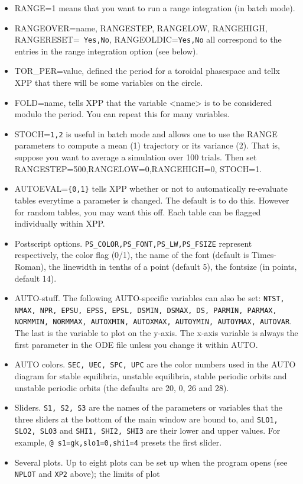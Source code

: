 \documentclass{article}
\begin{document}
\begin{itemize}
reached.
\item RANGE=1 means that you want to run a range integration (in batch
mode). 
\item RANGEOVER=name, RANGESTEP, RANGELOW, RANGEHIGH, RANGERESET={\tt
Yes,No}, RANGEOLDIC={\tt Yes,No} all correspond to the entries in the
range integration option (see below).
\item TOR\_PER=value, defined the period for a toroidal phasespace and
tellx XPP that there will be some variables on the circle.
\item FOLD=name, tells XPP that the variable <name> is to be
considered modulo the period.  You can repeat this for many variables.
\item STOCH={\tt 1,2} is useful in batch mode and allows one to use
the RANGE parameters to compute a mean (1) trajectory or its variance
(2).  That is, suppose you want to average a simulation over 100
trials.  Then set RANGESTEP=500,RANGELOW=0,RANGEHIGH=0, STOCH=1. 
\item AUTOEVAL={\tt \{0,1\}} tells XPP whether or not to automatically
re-evaluate tables everytime a parameter is changed. The default is 
to do this. However for random tables, you may want this off. Each
table can be flagged individually within XPP.
\item Postscript options. {\tt PS\_COLOR,PS\_FONT,PS\_LW,PS\_FSIZE}
represent respectively, the color flag (0/1), the name of the font
(default is Times-Roman), the linewidth in tenths of a point (default
5), the fontsize (in points, default 14). 
\item AUTO-stuff. The following AUTO-specific variables can also be
set: {\tt NTST, NMAX, NPR, EPSU, EPSS, EPSL, DSMIN, DSMAX, DS, PARMIN, PARMAX, NORMMIN,
NORMMAX, AUTOXMIN, AUTOXMAX, AUTOYMIN, AUTOYMAX, AUTOVAR}.  The last
is the variable to plot on the y-axis. The x-axis variable is always
the first parameter in the ODE file unless you change it within AUTO. 
\item AUTO colors. {\tt SEC, UEC, SPC, UPC} are the color numbers used in the AUTO diagram for stable equilibria,
unstable equilibria, stable periodic orbits and unstable periodic orbits (the defaults are 20, 0, 26 and 28).
\item Sliders. {\tt S1, S2, S3} are the names of the parameters or variables that the three sliders at the bottom of the main window are bound
to, and {\tt SLO1, SLO2, SLO3} and {\tt SHI1, SHI2, SHI3} are their lower and upper values.  For example,
{\tt @ s1=gk,slo1=0,shi1=4} presets the first slider.
\item Several plots. Up to eight plots can be set up when the program opens (see {\tt NPLOT} and {\tt XP2} above); the limits of plot

\end{itemize}
\end{document}
